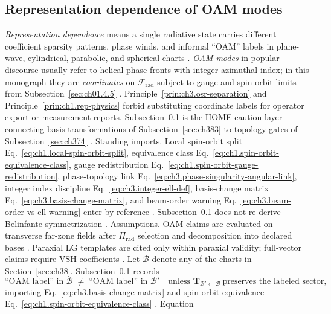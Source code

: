 \subsection{Representation dependence of OAM modes}
\label{sec:ch384}
\emph{Representation dependence} means a single radiative state carries different coefficient sparsity patterns, phase winds, and informal
``OAM'' labels in plane-wave, cylindrical, parabolic, and spherical charts \cite{allen1992}.
\emph{OAM modes} in popular discourse usually refer to helical phase fronts with integer azimuthal index; in this monograph they are
\emph{coordinates} on \(\mathcal{F}_{\mathrm{rad}}\) subject to gauge and spin-orbit limits from Subsection~\ref{sec:ch01.4.5}
\cite{belinfante1940}. Principle~\ref{prin:ch3.osr-separation} and
Principle~\ref{prin:ch1.rep-physics} forbid substituting coordinate labels for operator export or measurement
reports. Subsection~\ref{sec:ch384} is the HOME caution layer connecting basis transformations of
Subsection~\ref{sec:ch383} to topology gates of Subsection~\ref{sec:ch374} \cite{harrington2001}.
Standing imports. Local spin-orbit split Eq.~\eqref{eq:ch1.local-spin-orbit-split}, equivalence class
Eq.~\eqref{eq:ch1.spin-orbit-equivalence-class}, gauge redistribution Eq.~\eqref{eq:ch1.spin-orbit-gauge-redistribution},
phase-topology link Eq.~\eqref{eq:ch3.phase-singularity-angular-link}, integer index discipline
Eq.~\eqref{eq:ch3.integer-ell-def}, basis-change matrix Eq.~\eqref{eq:ch3.basis-change-matrix}, and beam-order warning
Eq.~\eqref{eq:ch3.beam-order-vs-ell-warning} enter by reference \cite{belinfante1940}. Subsection~\ref{sec:ch384}
does not re-derive Belinfante symmetrization \cite{belinfante1940}.
Assumptions. OAM claims are evaluated on transverse far-zone fields after \(\Pi_{\mathrm{rad}}\) selection and decomposition into declared bases
\cite{harrington2001}. Paraxial LG templates are cited only within paraxial validity; full-vector claims require VSH coefficients
\cite{allen1992}.
Let \(\mathcal{B}\) denote any of the charts in Section~\ref{sec:ch38}. Subsection~\ref{sec:ch384} records
\begin{equation}
\label{eq:ch3.OAM-representation-dependence}
\text{``OAM label'' in }\mathcal{B}
\;\neq\;
\text{``OAM label'' in }\mathcal{B}'
\quad\text{unless }\mathbf{T}_{\mathcal{B}'\leftarrow\mathcal{B}}\ \text{preserves the labeled sector},
\end{equation}
importing Eq.~\eqref{eq:ch3.basis-change-matrix} and spin-orbit equivalence
Eq.~\eqref{eq:ch1.spin-orbit-equivalence-class} \cite{belinfante1940}. Equation

